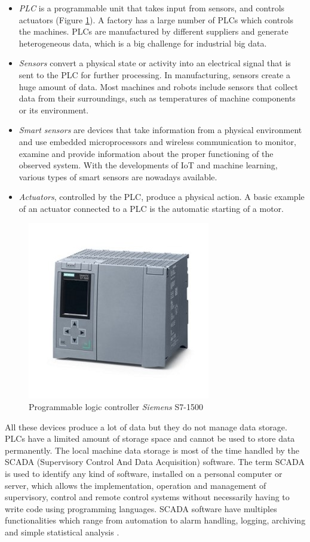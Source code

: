 \begin{itemize}
    \item \textit{PLC} is a programmable unit that takes input from sensors, and controls actuators (Figure \ref{fig:plc}). A factory has a large number of PLCs which controls the machines. PLCs are manufactured by different suppliers and generate heterogeneous data, which is a big challenge for industrial big data.
    \item \textit{Sensors} convert a physical state or activity into an electrical signal that is sent to the PLC for further processing. In manufacturing, sensors create a huge amount of data. Most machines and robots include sensors that collect data from their surroundings, such as temperatures of machine components or its environment.
    \item \textit{Smart sensors} are devices that take information from a physical environment and use embedded microprocessors and wireless communication to monitor, examine and provide information about the proper functioning of the observed system. With the developments of IoT and machine learning, various types of smart sensors are nowadays available.
    \item \textit{Actuators}, controlled by the PLC, produce a physical action. A basic example of an actuator connected to a PLC is the automatic starting of a motor. 
\end{itemize}
%
\begin{figure}
\centerline{\includegraphics[scale=1]{images/chapter_3/PLC.jpg}}
\caption{Programmable logic controller \textit{Siemens} S7-1500}
\label{fig:plc}
\end{figure}
%
All these devices produce a lot of data but they do not manage data storage. PLCs have a limited amount of storage space and cannot be used to store data permanently. The local machine data storage is most of the time handled by the SCADA (Supervisory Control And Data Acquisition) software. The term SCADA is used to identify any kind of software, installed on a personal computer or server, which allows the implementation, operation and management of supervisory, control and remote control systems without necessarily having to write code using programming languages. SCADA software have multiples functionalities which range from automation to alarm handling, logging, archiving and simple statistical analysis \citep{daneels1999scada}. 
